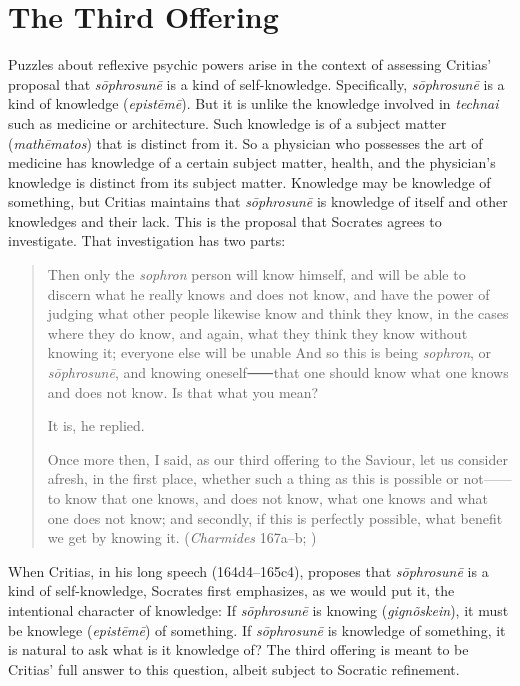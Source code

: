 
\section{The Third Offering} %
\label{sec:the_third_offering}

Puzzles about reflexive psychic powers arise in the context of assessing Critias' proposal that \emph{sōphrosunē} is a kind of self-knowledge. Specifically, \emph{sōphrosunē} is a kind of knowledge (\emph{epistēmē}). But it is unlike the knowledge involved in \emph{technai} such as medicine or architecture. Such knowledge is of a subject matter (\emph{mathēmatos}) that is distinct from it. So a physician who possesses the art of medicine has knowledge of a certain subject matter, health, and the physician's knowledge is distinct from its subject matter. Knowledge may be knowledge of something, but Critias maintains that \emph{sōphrosunē} is knowledge of itself and other knowledges and their lack. This is the proposal that Socrates agrees to investigate. That investigation has two parts:

\begin{quotation}
	Then only the \emph{sophron} person will know himself, and will be able to discern what he really knows and does not know, and have the power of judging what other people likewise know and think they know, in the cases where they do know, and again, what they think they know without knowing it; everyone else will be unable And so this is being \emph{sophron}, or \emph{sōphrosunē}, and knowing oneself⸺that one should know what one knows and does not know. Is that what you mean?
	
	It is, he replied.
	
	Once more then, I said, as our third offering to the Saviour, let us consider afresh, in the first place, whether such a thing as this is possible or not——to know that one knows, and does not know, what one knows and what one does not know; and secondly, if this is perfectly possible, what benefit we get by knowing it. (\emph{Charmides} 167a–b; \citealt[57]{Lamb:1927qw})
\end{quotation}

When Critias, in his long speech (164d4–165c4), proposes that \emph{sōphrosunē} is a kind of self-knowledge, Socrates first emphasizes, as we would put it, the intentional character of knowledge: If \emph{sōphrosunē} is knowing (\emph{gignõskein}), it must be knowlege (\emph{epistēmē}) of something. If \emph{sōphrosunē} is knowledge of something, it is natural to ask what is it knowledge of? The third offering is meant to be Critias' full answer to this question, albeit subject to Socratic refinement.

